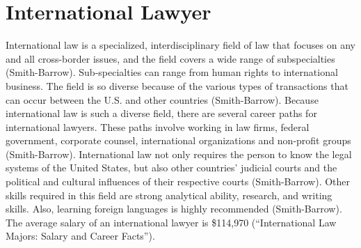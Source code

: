 \chapter{International Lawyer}

International law is a specialized, interdisciplinary field of law that focuses on any and all cross-border issues, and the field covers a wide range of subspecialties (Smith-Barrow). Sub-specialties can range from human rights to international business. The field is so diverse because of the various types of transactions that can occur between the U.S. and other countries (Smith-Barrow). Because international law is such a diverse field, there are several career paths for international lawyers. These paths involve working in law firms, federal government, corporate counsel, international organizations and non-profit groups (Smith-Barrow). International law not only requires the person to know the legal systems of the United States, but also other countries’ judicial courts and the political and cultural influences of their respective courts (Smith-Barrow). Other skills required in this field are strong analytical ability, research, and writing skills. Also, learning foreign languages is highly recommended (Smith-Barrow). The average salary of an international lawyer is \$114,970 (“International Law Majors: Salary and Career Facts”).

